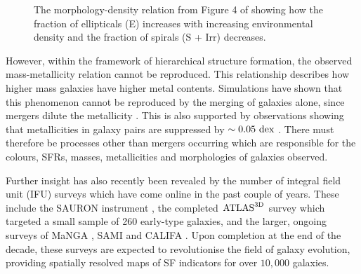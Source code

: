 \begin{figure}[t]
\caption[Morphology Density relation from Figure 4 of \cite{dressler80}]{The morphology-density relation from Figure 4 of \cite{dressler80} showing how the fraction of ellipticals (E) increases with increasing environmental density and the fraction of spirals (S + Irr) decreases.}
\label{fig:dressler}
\end{figure}

However, within the framework of hierarchical structure formation, the observed mass-metallicity relation \citep{tremonti04} cannot be reproduced. This relationship describes how higher mass galaxies have higher metal contents. Simulations have shown that this phenomenon cannot be reproduced by the merging of galaxies alone, since mergers dilute the metallicity \citep{pipino08,rupke10, montuori10, torrey12}. This is also supported by observations showing that metallicities in galaxy pairs are suppressed by $\sim0.05~\rm{dex}$ \citep{ellison08, michel08, scudder12}. There must therefore be processes other than mergers occurring which are responsible for the colours, SFRs, masses, metallicities and morphologies of galaxies observed. 

Further insight has also recently been revealed by the number of integral field unit (IFU) surveys which have come online in the past couple of years. These include the SAURON instrument \citep{bacon01}, the completed $\rm{ATLAS}^{\rm{3D}}$ survey \citep{cappellari11} which targeted a small sample of 260 early-type galaxies, and the larger, ongoing surveys of MaNGA \citep{bundy15}, SAMI \citep{croom12} and CALIFA \citep{sanchez12}. Upon completion at the end of the decade, these surveys are expected to revolutionise the field of galaxy evolution, providing spatially resolved maps of SF indicators for over $10,000$ galaxies.

